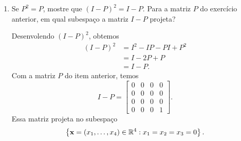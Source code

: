 \documentclass[leqno]{article}
\begin{document}
\begin{enumerate}

\item Se $P^2 = P$, mostre que $(I - P)^2 = I - P$. Para a matriz $P$ do exercício anterior, em qual subespaço a matriz $I - P$ projeta?

\begin{sol} 

    Desenvolendo \( ( I - P )^{ 2 } \), obtemos
    \begin{align*}
        ( I - P )^{ 2 } &= I^2 - I P - P I + P^2 \\
                        &= I - 2 P + P \\
                        &= I - P
    .\end{align*}
    Com a matriz \( P \) do item anterior, temos
    \begin{equation*}
        I - P =
        \begin{bmatrix}
            0 & 0 & 0 & 0 \\
            0 & 0 & 0 & 0 \\
            0 & 0 & 0 & 0 \\
            0 & 0 & 0 & 1
        \end{bmatrix}
    .\end{equation*}
    Essa matriz projeta no subespaço
    \begin{equation*}
        \left\{ \mathbf{x} = ( x_{ 1 }, \dots, x_{ 4 } ) \in \mathbb{R}^{ 4 } : x_{ 1 } = x_{ 2 } = x_{ 3 } = 0 \right\}
    .\end{equation*}
\end{sol} 
\end{enumerate}
\end{document}
